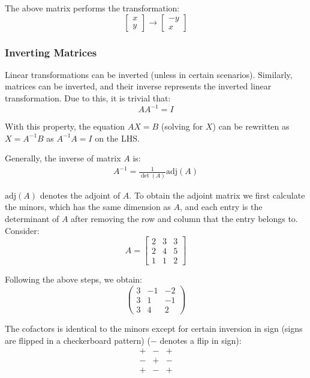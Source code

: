 \documentclass[12pt]{article}
\newcommand{\adj}{\text{adj}}
\theoremstyle{definition}
\begin{document}
	The above matrix performs the transformation:
	\begin{equation*}
		\begin{bmatrix}
			x \\ y
		\end{bmatrix} \to \begin{bmatrix}
			-y \\ x
		\end{bmatrix}
	\end{equation*}
	
	\subsubsection{Inverting Matrices}
	
	Linear transformations can be inverted (unless in certain scenarios). Similarly, matrices can be inverted, and their inverse represents the inverted linear transformation. Due to this, it is trivial that:
	$$AA^{-1} = I$$
	
	With this property, the equation $AX = B$ (solving for $X$) can be rewritten as $X = A^{-1}B$ as $A^{-1}A = I$ on the LHS.
	
	Generally, the inverse of matrix $A$ is:
	\begin{gather*}
		A^{-1} = \frac{1}{\det(A)} \adj(A)
	\end{gather*}
	
	$\adj(A)$ denotes the adjoint of $A$. To obtain the adjoint matrix we first calculate the minors, which has the same dimension as $A$, and each entry is the determinant of $A$ after removing the row and column that the entry belongs to. Consider:
	\begin{equation*}
		A = \begin{bmatrix}
			2 & 3 & 3 \\ 2 & 4 & 5 \\ 1 & 1 & 2
		\end{bmatrix}
	\end{equation*}
	
	Following the above steps, we obtain:
	\begin{equation*}
		\begin{pmatrix}
			3 & -1 & -2 \\ 3 & 1 & -1 \\ 3 & 4 & 2
		\end{pmatrix}
	\end{equation*}
	
	The cofactors is identical to the minors except for certain inversion in sign (signs are flipped in a checkerboard pattern) ($-$ denotes a flip in sign):
	\begin{equation*}
		\begin{matrix}
			+ & - & + \\ - & + & - \\ + & - & +
		\end{matrix}
	\end{equation*}
	
\end{document}
